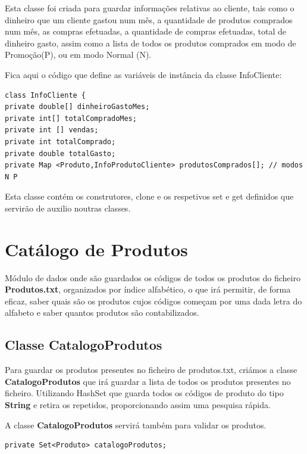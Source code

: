 Esta classe foi criada para guardar informações relativas ao cliente, tais como o dinheiro que um cliente gastou num mês, a quantidade de produtos comprados num mês, as compras efetuadas, a quantidade de compras efetuadas, total de dinheiro gasto, assim como a lista de todos os produtos comprados em modo de Promoção(P), ou em modo Normal (N).  


Fica aqui o código que define as variáveis de instância da classe InfoCliente:

\begin{Verbatim}
class InfoCliente {
private double[] dinheiroGastoMes;
private int[] totalCompradoMes;
private int [] vendas;
private int totalComprado;
private double totalGasto;
private Map <Produto,InfoProdutoCliente> produtosComprados[]; // modos N P

\end{Verbatim}


Esta classe contém os construtores, clone e os respetivos set e get definidos que servirão de auxilio noutras classes. 



\section{Catálogo de Produtos}

 Módulo de dados onde são guardados os códigos de todos os produtos do ficheiro \textbf{Produtos.txt}, organizados por índice alfabético, o que irá permitir, de forma eficaz, saber quais são os produtos cujos códigos começam por uma dada letra do alfabeto e saber quantos produtos são contabilizados. 
 
 \subsection{Classe CatalogoProdutos}
 
 Para guardar os produtos presentes no ficheiro de produtos.txt, criámos a classe \color{blue} \textbf{CatalogoProdutos} \color{black} que
 irá guardar a lista de todos os produtos presentes no ficheiro. Utilizando \color{blue} HashSet \color{black} que guarda todos os códigos de produto do tipo \color{blue} \textbf{String} \color{black} e retira os repetidos, proporcionando assim uma pesquisa rápida.
 
 A classe \color{blue} \textbf{CatalogoProdutos} \color{black} servirá também para validar os produtos.

\begin{verbatim}
private Set<Produto> catalogoProdutos;
\end{verbatim}

